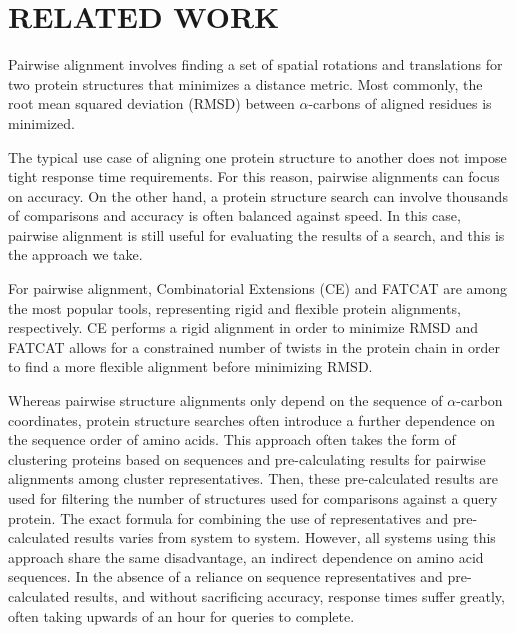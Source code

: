 \documentclass[a4,center,fleqn]{NAR}
\newcommand{\ca}{$\alpha$-carbon\xspace}
\newcommand{\cas}{$\alpha$-carbons\xspace}
\begin{document}
\enlargethispage{-65.1pt}

\section{RELATED WORK}

Pairwise alignment involves finding a set of spatial rotations and translations for two protein structures that minimizes a distance metric. 
Most commonly, the root mean squared deviation (RMSD) between \cas of aligned residues is minimized.

The typical use case of aligning one protein structure to another does not impose tight response time requirements. 
For this reason, pairwise alignments can focus on accuracy. 
On the other hand, a protein structure search can involve thousands of comparisons and accuracy is often balanced against speed. 
In this case, pairwise alignment is still useful for evaluating the results of a search, and this is the approach we take. 

For pairwise alignment, Combinatorial Extensions (CE) \cite{Shindyalov1998} and FATCAT \cite{Ye2003} are among the most popular tools, representing rigid and flexible protein alignments, respectively. 
CE performs a rigid alignment in order to minimize RMSD and FATCAT allows for a constrained number of twists in the protein chain in order to find a more flexible alignment before minimizing RMSD.

Whereas pairwise structure alignments only depend on the sequence of \ca coordinates, protein structure searches often introduce a further dependence on the sequence order of amino acids.
This approach often takes the form of clustering proteins based on sequences and pre-calculating results for pairwise alignments among cluster representatives. 
Then, these pre-calculated results are used for filtering the number of structures used for comparisons against a query protein.
The exact formula for combining the use of representatives and pre-calculated results varies from system to system.
However, all systems using this approach share the same disadvantage, an indirect dependence on amino acid sequences. 
In the absence of a reliance on sequence representatives and pre-calculated results, and without sacrificing accuracy, response times suffer greatly, often taking upwards of an hour for queries to complete. 
\end{document}
